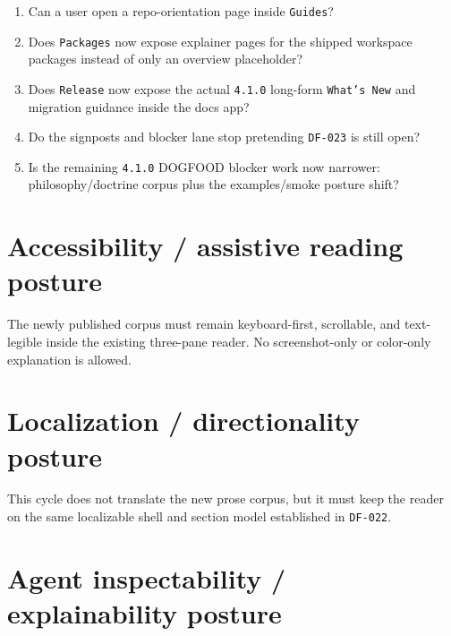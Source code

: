 \begin{enumerate}
\def\labelenumi{\arabic{enumi}.}
\tightlist
\item
  Can a user open a repo-orientation page inside \texttt{G\allowbreak{}u\allowbreak{}i\allowbreak{}d\allowbreak{}e\allowbreak{}s}?
\item
  Does \texttt{P\allowbreak{}a\allowbreak{}c\allowbreak{}k\allowbreak{}a\allowbreak{}g\allowbreak{}e\allowbreak{}s} now expose explainer pages for the shipped workspace packages instead of only an overview placeholder?
\item
  Does \texttt{R\allowbreak{}e\allowbreak{}l\allowbreak{}e\allowbreak{}a\allowbreak{}s\allowbreak{}e} now expose the actual \texttt{4\allowbreak{}.\allowbreak{}1\allowbreak{}.\allowbreak{}0} long-form \texttt{W\allowbreak{}h\allowbreak{}a\allowbreak{}t\allowbreak{}'\allowbreak{}s\allowbreak{} \allowbreak{}N\allowbreak{}e\allowbreak{}w} and migration guidance inside the docs app?
\item
  Do the signposts and blocker lane stop pretending \texttt{D\allowbreak{}F\allowbreak{}-\allowbreak{}0\allowbreak{}2\allowbreak{}3} is still open?
\item
  Is the remaining \texttt{4\allowbreak{}.\allowbreak{}1\allowbreak{}.\allowbreak{}0} DOGFOOD blocker work now narrower: philosophy/doctrine corpus plus the examples/smoke posture shift?
\end{enumerate}

\section{Accessibility / assistive reading posture}\label{record-084-accessibility-assistive-reading-posture}

The newly published corpus must remain keyboard-first, scrollable, and text-legible inside the existing three-pane reader. No screenshot-only or color-only explanation is allowed.

\section{Localization / directionality posture}\label{record-084-localization-directionality-posture}

This cycle does not translate the new prose corpus, but it must keep the reader on the same localizable shell and section model established in \texttt{D\allowbreak{}F\allowbreak{}-\allowbreak{}0\allowbreak{}2\allowbreak{}2}.

\section{Agent inspectability / explainability posture}\label{record-084-agent-inspectability-explainability-posture}

